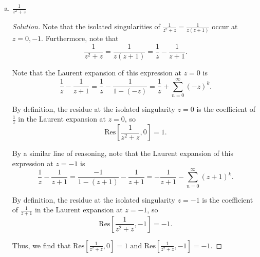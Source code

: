 \documentclass[11pt]{article}
\newcommand{\Sum}{\sum\limits_{n=0}^{\infty}}
\newenvironment{solution}
  {\renewcommand\qedsymbol{$\blacksquare$}\begin{proof}[Solution]}
  {\end{proof}}
\theoremstyle{definition}
\begin{document}
\begin{enumerate}[a)]
\begin{solution}
	Similarly, by Rule 2, we have that

	\begin{align*} \mathrm{Res}\left[\frac{z}{(z^2+1)^2}, -i\right] &= \lim\limits_{z \rightarrow -i} \frac{d}{dz} \left[ (z+i)^2 \frac{z}{z^2+1}\right] \\
		&= \lim\limits_{z \rightarrow -i} \frac{d}{dz} \left[ \frac{z}{(z-i)^2}\right] \\
		&= \lim\limits_{z \rightarrow -i} -\frac{z + i}{(z-i)^3} \\
		&= 0.\end{align*}	
	
	Thus, we conclude that $\boxed{ \mathrm{Res}\left[\frac{z}{(z^2+1)^2}, i\right] = 0 \text{ and } \mathrm{Res}\left[\frac{z}{(z^2+1)^2}, -i\right] = 0 }$.
	\end{solution}

	\item $\frac{1}{z^2+z}$
	
	\begin{solution}
	Note that the isolated singularities of $\frac{1}{z^2+z} = \frac{1}{z(z+1)}$ occur at $z = 0, -1$. Furthermore, note that
	\[ \frac{1}{z^2+z} = \frac{1}{z(z+1)} = \frac{1}{z} - \frac{1}{z+1}. \]
	
	Note that the Laurent expansion of this expression at $z=0$ is 
	\[ \frac{1}{z} - \frac{1}{z+1} = \frac{1}{z} - \frac{1}{1 - (-z)} = \frac{1}{z} + \Sum (-z)^k.\]

	By definition, the residue at the isolated singularity $z=0$ is the coefficient of $\frac{1}{z}$ in the Laurent expansion at $z=0$, so \[ \mathrm{Res}\left[ \frac{1}{z^2+z}, 0\right] = 1.\]
	
	By a similar line of reasoning, note that the Laurent expansion of this expression at $z=-1$ is 
	\[ \frac{1}{z} - \frac{1}{z+1} = \frac{-1}{1-(z+1)} - \frac{1}{z+1} = -\frac{1}{z+1} - \Sum (z+1)^k.\]

	By definition, the residue at the isolated singularity $z=-1$ is the coefficient of $\frac{1}{z+1}$ in the Laurent expansion at $z=-1$, so \[ \mathrm{Res}\left[ \frac{1}{z^2+z}, -1\right] = -1.\]

	Thus, we find that $\boxed{\mathrm{Res}\left[ \frac{1}{z^2+z}, 0\right] = 1 \text{ and } \mathrm{Res}\left[ \frac{1}{z^2+z}, -1\right] = -1}.$
\end{solution}
\end{enumerate}
\end{document}
